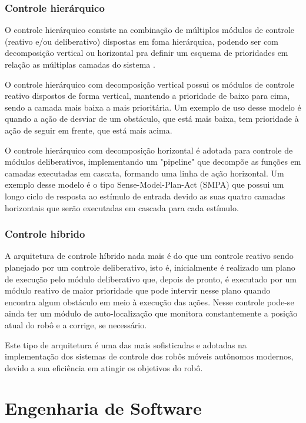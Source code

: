 \subsubsection{Controle hierárquico}
O controle hierárquico consiste na combinação de múltiplos módulos de controle (reativo e/ou deliberativo) dispostas em foma hierárquica, podendo ser com decomposição vertical ou horizontal pra definir um esquema de prioridades em relação as múltiplas camadas do sistema \cite{wolf2009robotica}.

O controle hierárquico com decomposição vertical possui os módulos de controle reativo dispostos de forma vertical, mantendo a prioridade de baixo para cima, sendo a camada mais baixa a mais prioritária. Um exemplo de uso desse modelo é quando a ação de desviar de um obstáculo, que está mais baixa, tem prioridade à ação de seguir em frente, que está mais acima.

O controle hierárquico com decomposição horizontal é adotada para controle de módulos deliberativos, implementando um "pipeline" que decompõe as funções em camadas executadas em cascata, formando uma linha de ação horizontal. Um exemplo desse modelo é o tipo Sense-Model-Plan-Act (SMPA) que possui um longo ciclo de resposta ao estímulo de entrada devido as suas quatro camadas horizontais que serão executadas em cascada para cada estímulo.

\subsubsection{Controle híbrido}
A arquitetura de controle híbrido nada mais é do que um controle reativo sendo planejado por um controle deliberativo, isto é, inicialmente é realizado um plano de execução pelo módulo deliberativo que, depois de pronto, é executado por um módulo reativo de maior prioridade que pode intervir nesse plano quando encontra algum obstáculo em meio à execução das ações. Nesse controle pode-se ainda ter um módulo de auto-localização que monitora constantemente a posição atual do robô e a corrige, se necessário.

Este tipo de arquitetura é uma das mais sofisticadas e adotadas na implementação dos sistemas de controle dos robôs móveis autônomos modernos, devido a sua eficiência em atingir os objetivos do robô. 


\section{Engenharia de Software}
